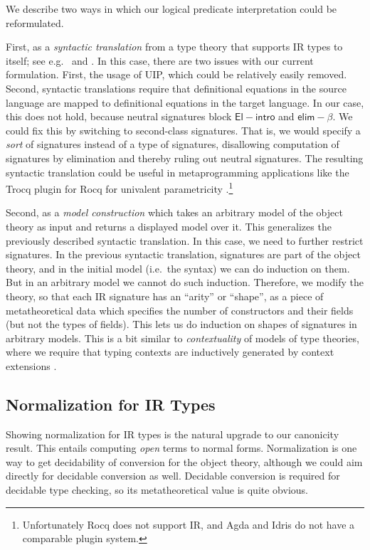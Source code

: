 \documentclass[acmsmall,screen,review,anonymous]{acmart}
\newcommand{\msf}[1]{{\mathsf{#1}}}
\newcommand{\elim}{\msf{elim}}
\newcommand{\Elintro}{\msf{El\!\!-\!\!intro}}
\newcommand{\elimbeta}{\elim\!-\!\!\beta}
\begin{document}
We describe two ways in which our logical predicate interpretation could be reformulated.

First, as a \emph{syntactic translation} from a type theory that supports IR types to itself; see
e.g.\ \cite{next700} and \cite{bernardy12parametricity}. In this case, there are two issues with our
current formulation. First, the usage of UIP, which could be relatively easily removed. Second,
syntactic translations require that definitional equations in the source language are mapped to
definitional equations in the target language. In our case, this does not hold, because neutral
signatures block $\Elintro$ and $\elimbeta$. We could fix this by switching to second-class
signatures.  That is, we would specify a \emph{sort} of signatures instead of a type of signatures,
disallowing computation of signatures by elimination and thereby ruling out neutral signatures. The
resulting syntactic translation could be useful in metaprogramming applications like the Trocq
plugin for Rocq for univalent parametricity \cite{cohen2024trocq}.\footnote{Unfortunately Rocq does
not support IR, and Agda and Idris do not have a comparable plugin system.}

Second, as a \emph{model construction} which takes an arbitrary model of the object theory as input
and returns a displayed model over it. This generalizes the previously described syntactic
translation. In this case, we need to further restrict signatures. In the previous syntactic
translation, signatures are part of the object theory, and in the initial model (i.e.\ the
syntax) we can do induction on them. But in an arbitrary model we cannot do such induction.
Therefore, we modify the theory, so that each IR signature has an ``arity'' or ``shape'', as a piece
of metatheoretical data which specifies the number of constructors and their fields (but not the
types of fields). This lets us do induction on shapes of signatures in arbitrary models. This is a
bit similar to \emph{contextuality} of models of type theories, where we require that typing
contexts are inductively generated by context extensions \cite{gat,cwfs}.

\subsection{Normalization for IR Types}

Showing normalization for IR types is the natural upgrade to our canonicity result. This entails
computing \emph{open} terms to normal forms. Normalization is one way to get decidability of
conversion for the object theory, although we could aim directly for decidable conversion as well.
Decidable conversion is required for decidable type checking, so its metatheoretical value is quite
obvious.
\end{document}
